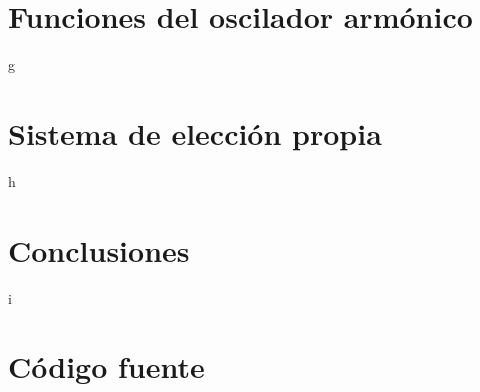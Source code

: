 \documentclass[twocolumn, aps, prd, 10pt, superscriptaddress, nofootinbib]{revtex4-2}
\begin{document}
\section{Funciones del oscilador armónico}

g
\section{Sistema de elección propia}

h
\section{Conclusiones}

i



\newpage
\onecolumngrid
\appendix
\section{Código fuente}







\end{document}
